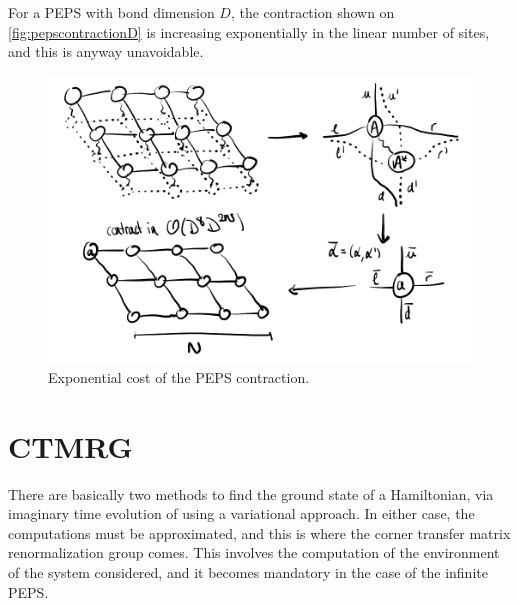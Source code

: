         For a PEPS with bond dimension $D$, the contraction shown on \autoref{fig:pepscontractionD} is increasing exponentially in the linear number of sites, and this is anyway unavoidable.

        \begin{figure}[h!]
            \centering
            \includegraphics[scale=0.2]{graphs/pepscontractionD.png}
            \caption{Exponential cost of the PEPS contraction.}
            \label{fig:pepscontractionD}
        \end{figure}

    \section{CTMRG}
        
        There are basically two methods to find the ground state of a Hamiltonian, via imaginary time evolution of using a variational approach. In either case, the computations must be approximated, and this is where the corner transfer matrix renormalization group comes. This involves the computation of the environment of the system considered, and it becomes mandatory in the case of the infinite PEPS.

